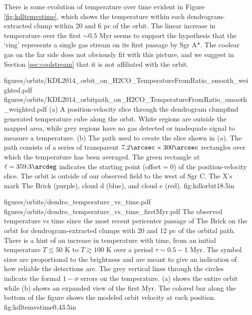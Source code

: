 There is some evolution of temperature over time evident in Figure
\ref{fig:kdltemvstime}, which shows the temperature within each
dendrogram-extracted clump within 20 \kms and 6 pc of the
\citet{Kruijssen2014d} orbit.  The linear increase in temperature over the
first $\sim0.5$ Myr seems to support the \citet{Kruijssen2014d} hypothesis that
the `ring' represents a single gas stream on its first passage by Sgr A*.
The coolear gas on the far side does not obviously fit with this picture, 
and we suggest in Section \ref{sec:coolstream} that it is not affiliated
with the orbit.

\RotFigureTwoAA
{figures/orbits/KDL2014_orbit_on_H2CO_TemperatureFromRatio_smooth_weighted.pdf}
{figures/orbits/KDL2014_orbitpath_on_H2CO_TemperatureFromRatio_smooth_weighted.pdf}
{(a) A position-velocity slice through the dendrogram clumpfind generated
temperature cube along the \citet{Kruijssen2014d} orbit.  White regions are
outside the mapped area, while grey regions have no gas detected or inadequate
signal to measure a temperature.
(b) The path used to create the slice shown in (a).  The path consists of a series
of transparent $7.2\arcsec\times300\arcsec$
rectangles over which the temperature has been averaged.  The green rectangle at
$\ell=359.3\arcdeg$ indicates the starting point (offset$=0$) of the position-velocity
slice.  The orbit is outside of our observed field to the west of Sgr C.  
The X's mark The Brick (purple), cloud d (blue), and cloud e (red).
}
{fig:kdlorbit}{1}{8.5in}

\FigureTwo
{figures/orbits/dendro_temperature_vs_time.pdf}
{figures/orbits/dendro_temperature_vs_time_firstMyr.pdf}
{The observed temperature vs time since the most recent pericenter passage of
The Brick on the \citet{Kruijssen2014d} orbit for dendrogram-extracted clumps with
20 \kms and 12 pc of the orbital path.  There is a hint of an 
increase in temperature with time, from an initial temperature $T\lesssim50$ K
to $T\gtrsim100$ K over a period $\tau\sim0.5-1$ Myr.  The symbol sizes are
proportional to the \para \threeohthree brightness and are meant to give
an indication of how reliable the detections are.  The grey vertical lines
through the circles indicate the formal $1-\sigma$ errors on the temperature.
(a) shows the entire orbit
while (b) shows an expanded
view of the first Myr.  The colored bar along the bottom of the figure shows the
modeled orbit velocity at each position.}
{fig:kdltemvstime}{0.4}{3.5in}

